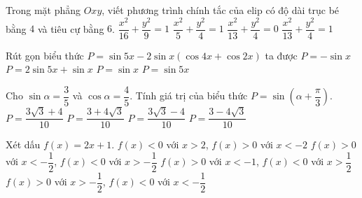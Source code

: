 \begin{ex}%
Trong mặt phẳng $Oxy$, viết phương trình chính tắc của elip có độ dài trục bé bằng $4$ và tiêu cự bằng $6$.
\choice
{$\dfrac{x^2}{16}+\dfrac{y^2}{9}=1$}
{$\dfrac{x^2}{5}+\dfrac{y^2}{4}=1$}
{\True $\dfrac{x^2}{13}+\dfrac{y^2}{4}=0$}
{$\dfrac{x^2}{13}+\dfrac{y^2}{4}=1$}
\end{ex}

\begin{ex}%
Rút gọn biểu thức $P=\sin 5x -2\sin x \left( \cos 4x +\cos 2x \right)$ ta được
\choice
{$P=-\sin x$}
{$P=2\sin 5x+\sin x$}
{\True $P=\sin x$}
{$P=\sin 5x$}
\end{ex}

\begin{ex}%
Cho $\sin \alpha =\dfrac{3}{5}$ và $\cos \alpha =\dfrac{4}{5}$. Tính giá trị của biểu thức $P=\sin \left( \alpha +\dfrac{\pi}{3} \right)$.
\choice
{$P=\dfrac{3\sqrt{3}+4}{10}$}
{\True $P=\dfrac{3+4\sqrt{3}}{10}$}
{$P=\dfrac{3\sqrt{3}-4}{10}$}
{$P=\dfrac{3-4\sqrt{3}}{10}$}
\end{ex}

\begin{ex}%
Xét dấu $f(x)=2x+1$.
\choice
{$f(x)<0$ với $x>2$, $f(x)>0$ với $x<-2$}
{$f(x)>0$ với $x<-\dfrac{1}{2}$, $f(x)<0$ với $x>-\dfrac{1}{2}$}
{$f(x)>0$ với $x<-1$, $f(x)<0$ với $x>\dfrac{1}{2}$}
{\True $f(x)>0$ với $x>-\dfrac{1}{2}$, $f(x)<0$ với $x<-\dfrac{1}{2}$}
\end{ex}

